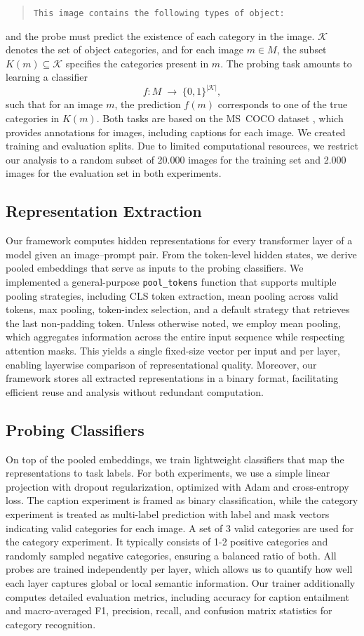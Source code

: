 \documentclass[11pt]{article}
\begin{document}
\begin{quote}
\texttt{This image contains the following types of object: }
\end{quote}
and the probe must predict the existence of each category in the image. $\mathcal{K}$ denotes the set of object categories, and for each image $m \in M$,
the subset $K(m) \subseteq \mathcal{K}$ specifies the categories present in $m$.
The probing task amounts to learning a classifier
\[
f : M \;\rightarrow\; \{0,1\} ^{|\mathcal{K}|},
\]
such that for an image $m$, the prediction $f(m)$ corresponds to one of the
true categories in $K(m)$.
Both tasks are based on the MS~COCO dataset \cite{lin2014microsoft}, which provides annotations
for images, including captions for each image. We created
training and evaluation splits. Due to limited computational resources, we restrict our analysis to a random subset of 20.000 images for the training set and 2.000 images for the evaluation set in both experiments.


\subsection{Representation Extraction}
Our framework computes hidden representations for every transformer layer of a model
given an image--prompt pair. From the token-level hidden states, we derive pooled embeddings
that serve as inputs to the probing classifiers. We implemented a general-purpose
\texttt{pool\_tokens} function that supports multiple pooling strategies, including
CLS token extraction, mean pooling across valid tokens, max pooling, token-index selection,
and a default strategy that retrieves the last non-padding token. Unless otherwise noted,
we employ mean pooling, which aggregates information across the entire input sequence
while respecting attention masks. This yields a single fixed-size vector per input
and per layer, enabling layerwise comparison of representational quality.
Moreover, our framework stores all extracted representations in a binary format,
facilitating efficient reuse and analysis without redundant computation.


\subsection{Probing Classifiers}
On top of the pooled embeddings, we train lightweight classifiers that map the
representations to task labels. For both experiments, we use a simple linear
projection with dropout regularization, optimized with Adam and cross-entropy loss.
The caption experiment is framed as binary classification, while the category experiment
is treated as multi-label prediction with label and mask vectors indicating valid
categories for each image. A set of 3 valid categories are used for the category experiment.
It typically consists of 1-2 positive categories and randomly sampled negative categories,
ensuring a balanced ratio of both. All probes are trained independently per layer, which allows
us to quantify how well each layer captures global or local semantic information.
Our trainer additionally computes detailed evaluation metrics, including accuracy for
caption entailment and macro-averaged F1, precision, recall, and confusion matrix
statistics for category recognition.
\end{document}
